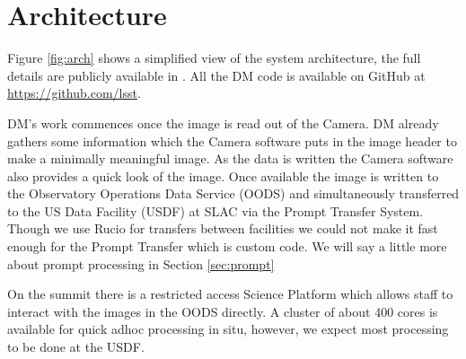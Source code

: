 \documentclass[11pt,twoside]{article}
\begin{document}
\section{Architecture}

Figure \ref{fig:arch} shows a simplified view of the system architecture, the full details are publicly available in \citep{LDM-148}. All the DM code is available on GitHub at \url{https://github.com/lsst}.

\begin{centering}
\end{centering}

DM's work commences once the image is read out of the Camera. DM already gathers some information which the Camera software puts in the image header to make a minimally meaningful image.
As the data is written the Camera software also provides a quick look  of the image.
Once available the image is written to the Observatory Operations Data Service (OODS) and simultaneously transferred to the US Data Facility (USDF) at SLAC via the Prompt Transfer System. Though we use Rucio for transfers between facilities we could not make it fast enough for the Prompt Transfer which is custom code.
We will say a little more about prompt processing in Section \ref{sec:prompt}

On the summit there is a restricted access Science Platform which allows staff to interact with the images in the OODS directly.
A cluster of about 400 cores is available for quick adhoc processing in situ, however, we expect most processing to be done at the USDF.
\end{document}
